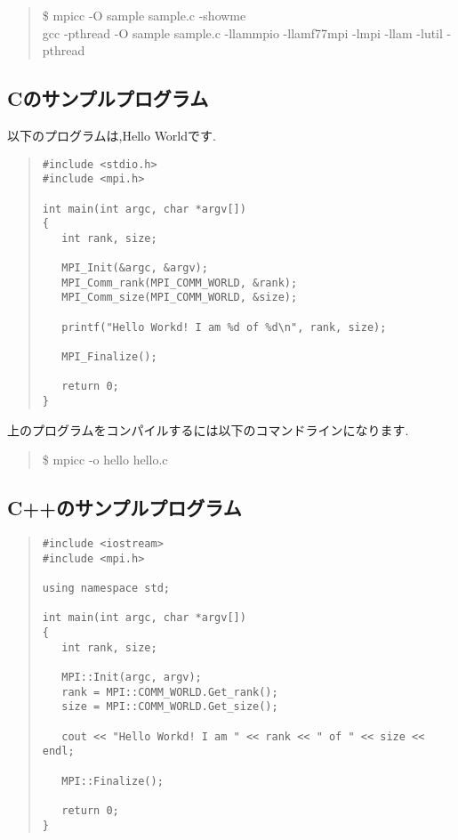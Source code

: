 \documentclass[a4paper,titlepage]{jreport}
\begin{document}
\begin{quote}
\begin{screen}
\$ mpicc -O sample sample.c -showme \\
gcc -pthread -O sample sample.c -llammpio -llamf77mpi -lmpi -llam -lutil -pthread
\end{screen}
\end{quote}

\subsection{Cのサンプルプログラム}
以下のプログラムは,Hello Worldです.

\begin{quote}
\begin{screen}
\begin{verbatim}
#include <stdio.h>
#include <mpi.h>

int main(int argc, char *argv[])
{
   int rank, size;

   MPI_Init(&argc, &argv);
   MPI_Comm_rank(MPI_COMM_WORLD, &rank);
   MPI_Comm_size(MPI_COMM_WORLD, &size);

   printf("Hello Workd! I am %d of %d\n", rank, size);

   MPI_Finalize();

   return 0;
}
\end{verbatim}
\end{screen}
\end{quote}

上のプログラムをコンパイルするには以下のコマンドラインになります.

\begin{quote}
\begin{screen}
\$ mpicc -o hello hello.c
\end{screen}
\end{quote}

\subsection{C++のサンプルプログラム}

\begin{quote}
\begin{screen}
\begin{verbatim}
#include <iostream>
#include <mpi.h>

using namespace std;

int main(int argc, char *argv[])
{
   int rank, size;

   MPI::Init(argc, argv);
   rank = MPI::COMM_WORLD.Get_rank();
   size = MPI::COMM_WORLD.Get_size();

   cout << "Hello Workd! I am " << rank << " of " << size << endl;

   MPI::Finalize();

   return 0;
}
\end{verbatim}
\end{screen}
\end{quote}
\end{document}
